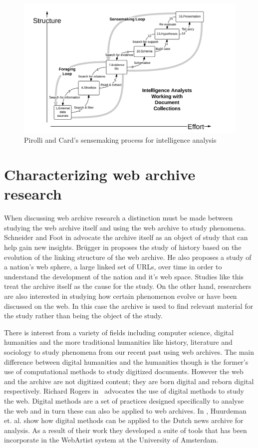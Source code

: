 \begin{figure}[!h]
\centering
\includegraphics[width=0.9\columnwidth]{images/sensemaking.png}
\caption{Pirolli and Card's sensemaking process for intelligence analysis}
\label{fig:figure2}
\end{figure}


\section{Characterizing web archive research} %
\label{sec:characterizing_web_archive_research}



When discussing web archive research a distinction must be made between studying the web archive itself and using the web archive to study phenomena. Schneider and Foot in \cite{schneider2004web} advocate the archive itself as an object of study that can help gain new insights. Br\"ugger in \cite{brugger2012historical} proposes the study of history based on the evolution of the linking structure of the web archive. He also proposes a study of a nation's web sphere, a large linked set of URLs, over time in order to understand the development of the nation and it's web space. Studies like this treat the archive itself as the cause for the study. On the other hand, researchers are also interested in studying how certain phenomenon evolve or have been discussed on the web. In this case the archive is used to find relevant material for the study rather than being the object of the study.

There is interest from a variety of fields including computer science, digital humanities and the more traditional humanities like history, literature and sociology to study phenomena from our recent past using web archives. The main difference between digital humanities and the humanities though is the former's use of computational methods to study digitized documents. However the web and the archive are not digitized content; they are born digital and reborn digital respectively. Richard Rogers in~\cite{rogers2013digital} advocates the use of digital methods to study the web. Digital methods are a set of practices designed specifically to analyse the web and in turn these can also be applied to web archives. In \cite{huurdeman2013sprint}, Huurdeman et. al. show how digital methods can be applied to the Dutch news archive for analysis. As a result of their work they developed a suite of tools that has been incorporate in the WebArtist system at the University of Amsterdam.

